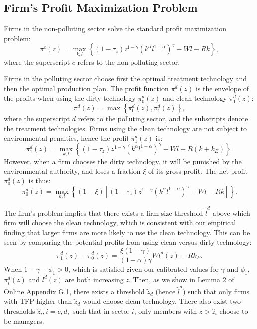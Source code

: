 \documentclass[AEJ]{AEA}
\begin{document}
\subsection{Firm's Profit Maximization Problem}

Firms in the non-polluting sector solve the standard profit maximization problem:
\begin{equation*}
    \pi^c(z) = \max_{k,l} \left\{ (1-\tau_z) z^{1-\gamma}(k^{\alpha}l^{1-\alpha})^{\gamma} - Wl - Rk \right\},
\end{equation*}
where the superscript $c$ refers to the non-polluting sector.

Firms in the polluting sector choose first the optimal treatment technology and then the optimal production plan. The profit function $\pi^d(z)$ is the envelope of the profits when using the dirty technology $\pi_0^d(z)$ and clean technology $\pi_1^d(z)$:
\begin{equation*}
    \pi^d(z) = \max \left\{ \pi_0^d(z), \pi_1^d(z) \right\},
\end{equation*}
where the superscript $d$ refers to the polluting sector, and the subscripts denote the treatment technologies. Firms using the clean technology are not subject to environmental penalties, hence the profit $\pi_1^d(z)$ is:
\begin{equation*}
    \pi_1^d(z) = \max_{k,l} \left\{ (1-\tau_z) z^{1-\gamma} (k^{\alpha} l^{1-\alpha})^{\gamma} - Wl - R (k+k_E) \right\}.
\end{equation*}
However, when a firm chooses the dirty technology, it will be punished by the environmental authority, and loses a fraction $\xi$ of its gross profit. The net profit $\pi_0^d(z)$ is thus:
\begin{equation*}
    \pi_0^d(z) = \max_{k,l} \left\{ \left( 1 - \xi \right)
        \left[ (1-\tau_z) z^{1-\gamma} (k^{\alpha} l^{1-\alpha})^{\gamma} - Wl - Rk \right] \right\}.
\end{equation*}

The firm's problem implies that there exists a firm size threshold $\tilde{l}^d$ above which firm will choose the clean technology, which is consistent with our empirical finding that larger firms are more likely to use the clean technology. This can be seen by comparing the potential profits from using clean versus dirty technology:
\begin{equation*}
    \pi_1^d(z) - \pi_0^d(z)  = \frac{\xi(1-\gamma)}{(1-\alpha)\gamma}Wl^d(z) - Rk_E.
\end{equation*}
When $1-\gamma+\phi_1 > 0$, which is satisfied given our calibrated values for $\gamma$ and $\phi_1$, $\pi_i^d(z)$ and $l^d(z)$ are both increasing $z$. Then, as we show in Lemma 2 of Online Appendix G.1, there exists a threshold $\tilde{z}_d$ (hence $\tilde{l}^d$) such that only firms with TFP higher than $\tilde{z}_d$ would choose clean technology. There also exist two thresholds $\hat{z}_i, i=c,d,$ such that in sector $i$, only members with $z > \hat{z}_i$ choose to be managers.
\end{document}
